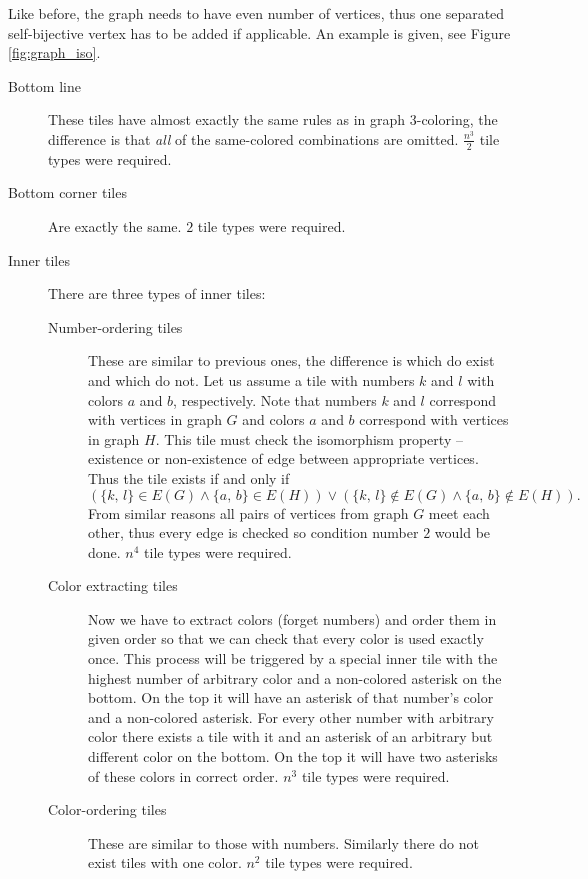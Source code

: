Like before, the graph needs to have even number of vertices, thus one separated self-bijective vertex has to be added if applicable. An example is given, see Figure \ref{fig:graph_iso}.
\begin{description}
	\item[Bottom line] These tiles have almost exactly the same rules as in graph 3-coloring, the difference is that {\em all} of the same-colored combinations are omitted. $\frac{n^3}{2}$ tile types were required.
	\item[Bottom corner tiles] Are exactly the same. $2$ tile types were required.
	\item[Inner tiles] There are three types of inner tiles:
	\begin{description}
		\item[Number-ordering tiles] These are similar to previous ones, the difference is which do exist and which do not. Let us assume a tile with numbers $k$ and $l$ with colors $a$ and $b$, respectively. Note that numbers $k$ and $l$ correspond with vertices in graph $G$ and colors $a$ and $b$ correspond with vertices in graph $H$. This tile must check the isomorphism property -- existence or non-existence of edge between appropriate vertices. Thus the tile exists if and only if
		$$(\{k,\,l\} \in E(G) \wedge \{a,\,b\} \in E(H)) \vee (\{k,\,l\} \notin E(G) \wedge \{a,\,b\} \notin E(H)) . $$
		From similar reasons all pairs of vertices from graph $G$ meet each other, thus every edge is checked so condition number $2$ would be done. $n^4$ tile types were required.
		\item[Color extracting tiles] Now we have to extract colors (forget numbers) and order them in given order so that we can check that every color is used exactly once. This process will be triggered by a special inner tile with the highest number of arbitrary color and a non-colored asterisk on the bottom. On the top it will have an asterisk of that number's color and a non-colored asterisk. For every other number with arbitrary color there exists a tile with it and an asterisk of an arbitrary but different color on the bottom. On the top it will have two asterisks of these colors in correct order. $n^3$ tile types were required.
		\item[Color-ordering tiles] These are similar to those with numbers. Similarly there do not exist tiles with one color. $n^2$ tile types were required.

\end{description}
\end{description}
